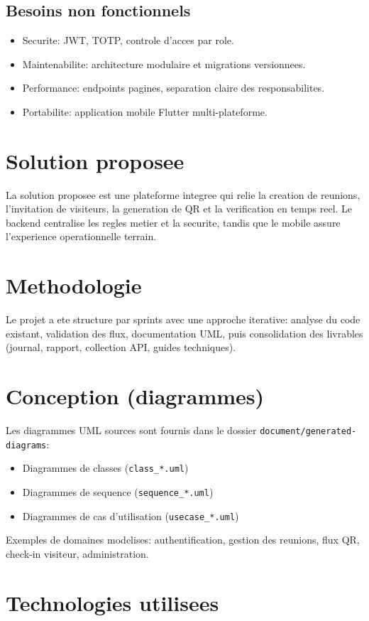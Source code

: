 \documentclass[12pt,a4paper]{article}
\begin{document}
\subsection{Besoins non fonctionnels}
\begin{itemize}
  \item Securite: JWT, TOTP, controle d'acces par role.
  \item Maintenabilite: architecture modulaire et migrations versionnees.
  \item Performance: endpoints pagines, separation claire des responsabilites.
  \item Portabilite: application mobile Flutter multi-plateforme.
\end{itemize}

\section{Solution proposee}
La solution proposee est une plateforme integree qui relie la creation de reunions, l'invitation de visiteurs, la generation de QR et la verification en temps reel. Le backend centralise les regles metier et la securite, tandis que le mobile assure l'experience operationnelle terrain.

\section{Methodologie}
Le projet a ete structure par sprints avec une approche iterative: analyse du code existant, validation des flux, documentation UML, puis consolidation des livrables (journal, rapport, collection API, guides techniques).

\section{Conception (diagrammes)}
Les diagrammes UML sources sont fournis dans le dossier \texttt{document/generated-diagrams}:
\begin{itemize}
  \item Diagrammes de classes (\texttt{class\_*.uml})
  \item Diagrammes de sequence (\texttt{sequence\_*.uml})
  \item Diagrammes de cas d'utilisation (\texttt{usecase\_*.uml})
\end{itemize}
Exemples de domaines modelises: authentification, gestion des reunions, flux QR, check-in visiteur, administration.

\section{Technologies utilisees}
\end{document}
